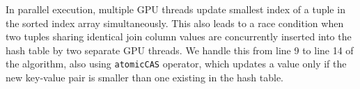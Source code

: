 \documentclass[nonacm,sigplan]{acmart}
\begin{document}
In parallel execution, multiple GPU threads update smallest index of a tuple in the sorted index array simultaneously. This also leads to a race condition when two tuples sharing identical join column values are concurrently inserted into the hash table by two separate GPU threads.  We handle this from line 9 to line 14 of the algorithm, also using \texttt{atomicCAS} operator, which updates a value only if the new key-value pair is smaller than one existing in the hash table.




\end{document}
